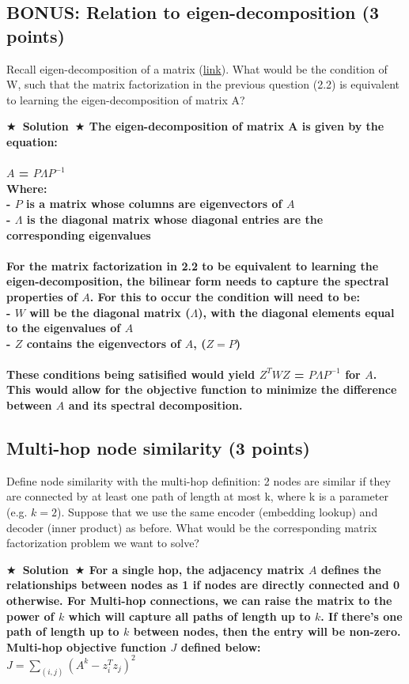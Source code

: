 \documentclass{article}
\numberwithin{figure}{section}
\newcommand{\Solution}[1]{{\medskip \color{red} \bf $\bigstar$~\sf \textbf{Solution}~$\bigstar$ \sf #1 } \bigskip}
\begin{document}
\subsection{BONUS: Relation to eigen-decomposition (3 points)}
Recall eigen-decomposition of a matrix (\href{https://en.wikipedia.org/wiki/Eigendecomposition_of_a_matrix}{link}). What would be the condition of W, such that the matrix factorization in the previous question (2.2) is equivalent to learning the eigen-decomposition of matrix A?

\Solution{The eigen-decomposition of matrix A is given by the equation: \\
\\
$A$ = $P$$\Lambda$$P^{-1}$ \\
Where:\\
- $P$ is a matrix whose columns are eigenvectors of $A$\\
- $\Lambda$ is the diagonal matrix whose diagonal entries are the corresponding eigenvalues\\\\
For the matrix factorization in 2.2 to be equivalent to learning the eigen-decomposition, the bilinear form needs to capture the spectral properties of $A$. For this to occur the condition will need to be:\\
- $W$ will be the diagonal matrix ($\Lambda$), with the diagonal elements equal to the eigenvalues of $A$\\
- $Z$ contains the eigenvectors of $A$, ($Z=P$)\\
\\
These conditions being satisified would yield $Z^{T}WZ$ = $P$$\Lambda$$P^{-1}$ for $A$. This would allow for the objective function to minimize the difference between $A$ and its spectral decomposition.}

\subsection{Multi-hop node similarity (3 points)}
Define node similarity with the multi-hop definition: 2 nodes are similar if they are connected by at least one path of length at most k, where k is a parameter (e.g. $k = 2$). Suppose that we use the same encoder (embedding lookup) and decoder (inner product) as before. What would be the corresponding matrix factorization problem we want to solve?

\Solution{
For a single hop, the adjacency matrix $A$ defines the relationships between nodes as 1 if nodes are directly connected and 0 otherwise. For Multi-hop connections, we can raise the matrix to the power of $k$ which will capture all paths of length up to $k$. If there's one path of length up to $k$ between nodes, then the entry will be non-zero. Multi-hop objective function $J$ defined below: \\

$J = \sum_{(i,j)}(A^k - z_i^{T}z_j)^2$
\\\\

}
\end{document}
